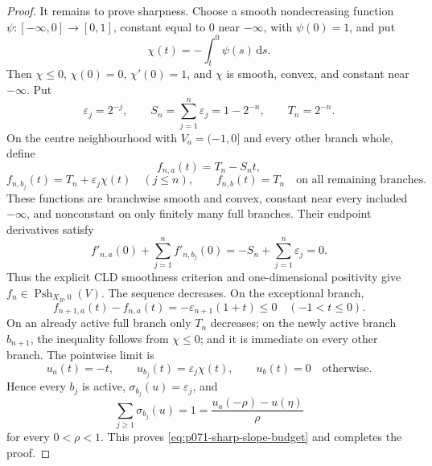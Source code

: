 \begin{proof}
It remains to prove sharpness.  Choose a smooth nondecreasing function
\(\psi:[-\infty,0]\to[0,1]\), constant equal to \(0\) near
\(-\infty\), with \(\psi(0)=1\), and put
\[
 \chi(t)=-\int_t^0\psi(s)\,\mathrm ds.
\]
Then \(\chi\leq0\), \(\chi(0)=0\), \(\chi'(0)=1\), and \(\chi\) is smooth,
convex, and constant near \(-\infty\).  Put
\[
 \varepsilon_j=2^{-j},
 \qquad
 S_n=\sum_{j=1}^n\varepsilon_j=1-2^{-n},
 \qquad
 T_n=2^{-n}.
\]
On the centre neighbourhood with \(V_a=(-1,0]\) and every other branch
whole, define
\[
 f_{n,a}(t)=T_n-S_nt,
\]
\[
 f_{n,b_j}(t)=T_n+\varepsilon_j\chi(t)
 \quad(j\leq n),
 \qquad
 f_{n,b}(t)=T_n
 \quad\text{on all remaining branches}.
\]
These functions are branchwise smooth and convex, constant near every
included \(-\infty\), and nonconstant on only finitely many full branches.
Their endpoint derivatives satisfy
\[
 f'_{n,a}(0)+\sum_{j=1}^n f'_{n,b_j}(0)
 =-S_n+\sum_{j=1}^n\varepsilon_j=0.
\]
Thus the explicit CLD smoothness criterion and one-dimensional positivity
give \(f_n\in\operatorname{Psh}_{X_B,0}(V)\).  The sequence decreases.  On
the exceptional branch,
\[
 f_{n+1,a}(t)-f_{n,a}(t)
 =-\varepsilon_{n+1}(1+t)\leq0
 \quad(-1<t\leq0).
\]
On an already active full branch only \(T_n\) decreases; on the newly active
branch \(b_{n+1}\), the inequality follows from \(\chi\leq0\); and it is
immediate on every other branch.  The pointwise limit is
\[
 u_a(t)=-t,
 \qquad
 u_{b_j}(t)=\varepsilon_j\chi(t),
 \qquad
 u_b(t)=0
 \quad\text{otherwise}.
\]
Hence every \(b_j\) is active,
\(\sigma_{b_j}(u)=\varepsilon_j\), and
\[
 \sum_{j\geq1}\sigma_{b_j}(u)=1
 =\frac{u_a(-\rho)-u(\eta)}{\rho}
\]
for every \(0<\rho<1\).  This proves
\eqref{eq:p071-sharp-slope-budget} and completes the proof.
\end{proof}
